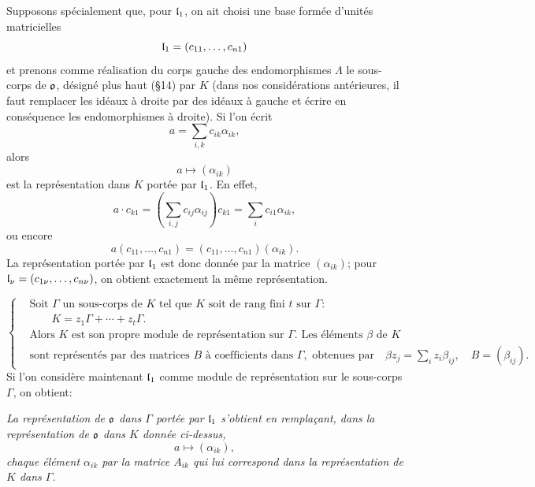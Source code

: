 Supposons spécialement que, pour $\mathfrak{l}_1$, on ait choisi une base formée d'unités matricielles
\[
\mathfrak{l}_1=(c_{11},\ldots,c_{n1})
\]
et prenons comme réalisation du corps gauche des endomorphismes $\Lambda$ le sous-corps de $\mathfrak{o}$, désigné plus haut (\S{}14) par $K$ (dans nos considérations antérieures, il faut remplacer les idéaux à droite par des idéaux à gauche et écrire en conséquence les endomorphismes à droite). Si l'on écrit
\[
a=\sum_{i,k}c_{ik}\alpha_{ik},
\]
alors
\[
a\longmapsto(\alpha_{ik})
\]
est la représentation dans $K$ portée par $\mathfrak{l}_1$. En effet,
\[
a\cdot c_{k1}
=\left(\sum_{i,j}c_{ij}\alpha_{ij}\right)c_{k1}
=\sum_i c_{i1}\alpha_{ik},
\]
ou encore
\[
a(c_{11},\ldots,c_{n1})
=(c_{11},\ldots,c_{n1})(\alpha_{ik}).
\]
La représentation portée par $\mathfrak{l}_1$ est donc donnée par la matrice $(\alpha_{ik})$; pour $\mathfrak{l}_\nu=(c_{1\nu},\ldots,c_{n\nu})$, on obtient exactement la même représentation.

\[
\left\{
\begin{aligned}
&\text{Soit }\Gamma\text{ un sous-corps de }K\text{ tel que }K\text{ soit de rang fini }t\text{ sur }\Gamma:\\
&\qquad K=z_1\Gamma+\cdots+z_t\Gamma.\\
&\text{Alors }K\text{ est son propre module de représentation sur }\Gamma.\text{ Les éléments }\beta\text{ de }K\\
&\text{sont représentés par des matrices }B\text{ à coefficients dans }\Gamma,\text{ obtenues par}\quad
\beta z_j=\sum_i z_i\beta_{ij},\quad B=(\beta_{ij}).
\end{aligned}
\right.
\]
Si l'on considère maintenant $\mathfrak{l}_1$ comme module de représentation sur le sous-corps $\Gamma$, on obtient:

\emph{La représentation de $\mathfrak{o}$ dans $\Gamma$ portée par $\mathfrak{l}_1$ s'obtient en remplaçant, dans la représentation de $\mathfrak{o}$ dans $K$ donnée ci-dessus,}
\[
        a\longmapsto(\alpha_{ik}),
\]
\emph{chaque élément $\alpha_{ik}$ par la matrice $A_{ik}$ qui lui correspond dans la représentation de $K$ dans $\Gamma$.}

